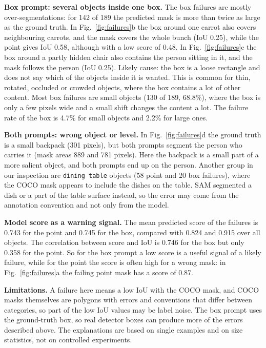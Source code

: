 \textbf{Box prompt: several objects inside one box.} The box failures are mostly over-segmentations: for 142 of 189 the predicted mask is more than twice as large as the ground truth. In Fig.~\ref{fig:failures}b the box around one carrot also covers neighbouring carrots, and the mask covers the whole bunch (IoU 0.25), while the point gives IoU 0.58, although with a low score of 0.48. In Fig.~\ref{fig:failures}c the box around a partly hidden chair also contains the person sitting in it, and the mask follows the person (IoU 0.25). Likely cause: the box is a loose rectangle and does not say which of the objects inside it is wanted. This is common for thin, rotated, occluded or crowded objects, where the box contains a lot of other content. Most box failures are small objects (130 of 189, 68.8\%), where the box is only a few pixels wide and a small shift changes the content a lot. The failure rate of the box is 4.7\% for small objects and 2.2\% for large ones.

\textbf{Both prompts: wrong object or level.} In Fig.~\ref{fig:failures}d the ground truth is a small backpack (301 pixels), but both prompts segment the person who carries it (mask areas 889 and 781 pixels). Here the backpack is a small part of a more salient object, and both prompts end up on the person. Another group in our inspection are \texttt{dining table} objects (58 point and 20 box failures), where the COCO mask appears to include the dishes on the table. SAM segmented a dish or a part of the table surface instead, so the error may come from the annotation convention and not only from the model.

\textbf{Model score as a warning signal.} The mean predicted score of the failures is 0.743 for the point and 0.745 for the box, compared with 0.824 and 0.915 over all objects. The correlation between score and IoU is 0.746 for the box but only 0.358 for the point. So for the box prompt a low score is a useful signal of a likely failure, while for the point the score is often high for a wrong mask: in Fig.~\ref{fig:failures}a the failing point mask has a score of 0.87.

\textbf{Limitations.} A failure here means a low IoU with the COCO mask, and COCO masks themselves are polygons with errors and conventions that differ between categories, so part of the low IoU values may be label noise. The box prompt uses the ground-truth box, so real detector boxes can produce more of the errors described above. The explanations are based on single examples and on size statistics, not on controlled experiments.
